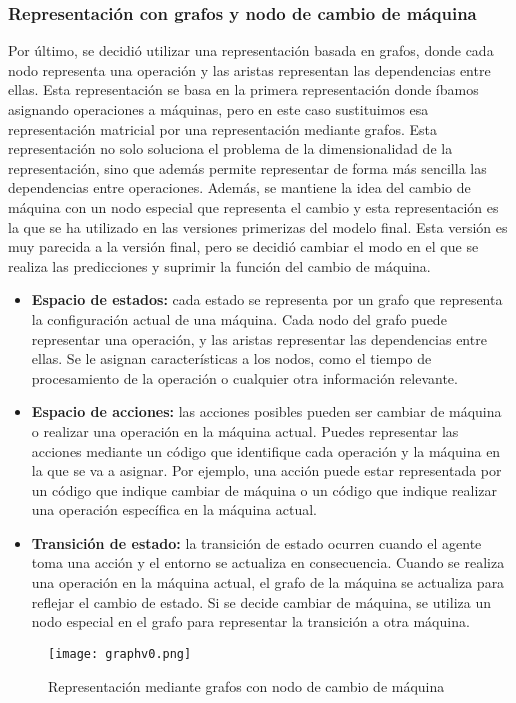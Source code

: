 \subsubsection{Representación con grafos y nodo de cambio de máquina}
Por último, se decidió utilizar una representación basada en grafos, donde cada nodo
representa una operación y las aristas representan las dependencias entre ellas. Esta
representación se basa en la primera representación donde íbamos asignando
operaciones a máquinas, pero en este caso sustituimos esa representación matricial por
una representación mediante grafos. Esta representación no solo soluciona el problema
de la dimensionalidad de la representación, sino que además permite representar de
forma más sencilla las dependencias entre operaciones. Además, se mantiene la idea del
cambio de máquina con un nodo especial que representa el cambio y esta representación
es la que se ha utilizado en las versiones primerizas del modelo final. Esta versión
es muy parecida a la versión final, pero se decidió cambiar el modo en el que se realiza
las predicciones y suprimir la función del cambio de máquina.

\begin{itemize}
    \item \textbf{Espacio de estados:} cada estado se representa por un grafo 
    que representa la configuración actual de una máquina. Cada nodo del grafo puede representar 
    una operación, y las aristas representar las dependencias entre ellas. Se le asignan
    características a los nodos, como el tiempo de procesamiento de la operación o cualquier 
    otra información relevante.
    \item \textbf{Espacio de acciones:} las acciones posibles pueden ser cambiar de máquina 
    o realizar una operación en la máquina actual. Puedes representar las acciones mediante 
    un código que identifique cada operación y la máquina en la que se va a asignar. Por 
    ejemplo, una acción puede estar representada por un código que indique cambiar de máquina o 
    un código que indique realizar una operación específica en la máquina actual.
    \item \textbf{Transición de estado:} la transición de estado ocurren cuando el agente 
    toma una acción y el entorno se actualiza en consecuencia. Cuando se realiza una operación 
    en la máquina actual, el grafo de la máquina se actualiza para reflejar el cambio de estado. 
    Si se decide cambiar de máquina, se utiliza un nodo especial en el grafo para representar 
    la transición a otra máquina.
\end{itemize}
\begin{figure}[ht]
    \centering
    \texttt{[image: graphv0.png]}
    \caption{Representación mediante grafos con nodo de cambio de máquina}
    \label{fig:rep-graph-v0}
\end{figure}
